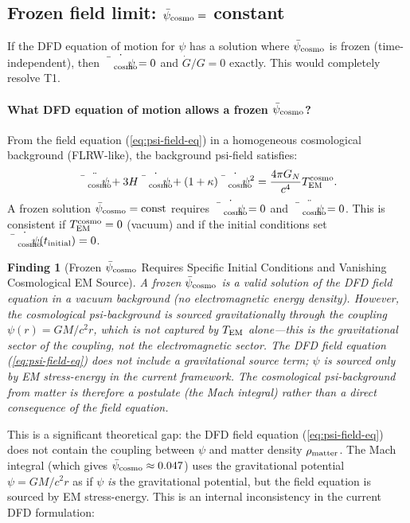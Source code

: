 \documentclass[11pt]{article}
\newtheorem{finding}{Finding}
\newcommand{\psicosmo}{\bar{\psi}_{\rm cosmo}}
\begin{document}
\subsection{Frozen field limit: $\psicosmo = $ constant}

If the DFD equation of motion for $\psi$ has a solution where $\psicosmo$
is frozen (time-independent), then $\dot{\psicosmo} = 0$ and
$\dot{G}/G = 0$ exactly. This would completely resolve T1.

\paragraph{What DFD equation of motion allows a frozen $\psicosmo$?}

From the field equation (\ref{eq:psi-field-eq}) in a homogeneous cosmological
background (FLRW-like), the background psi-field satisfies:
\begin{equation}
\ddot{\psicosmo} + 3H\dot{\psicosmo} + (1+\kappa)\dot{\psicosmo}^2 = \frac{4\pi G_N}{c^4}T_{\rm EM}^{\rm cosmo}.
\label{eq:psi-cosmo-EOM}
\end{equation}
A frozen solution $\psicosmo = \text{const}$ requires $\dot{\psicosmo} = 0$
and $\ddot{\psicosmo} = 0$. This is consistent if $T_{\rm EM}^{\rm cosmo} = 0$
(vacuum) and if the initial conditions set $\dot{\psicosmo}(t_{\rm initial}) = 0$.

\begin{finding}[Frozen $\psicosmo$ Requires Specific Initial Conditions and Vanishing Cosmological EM Source]
\label{find:frozen}
A frozen $\psicosmo$ is a valid solution of the DFD field equation in a vacuum
background (no electromagnetic energy density). However, the cosmological
psi-background is sourced gravitationally through the coupling
$\psi(r) = GM/c^2 r$, which is not captured by $T_{\rm EM}$ alone---this
is the \emph{gravitational} sector of the coupling, not the electromagnetic
sector. The DFD field equation (\ref{eq:psi-field-eq}) does not include a
gravitational source term; $\psi$ is sourced only by EM stress-energy in
the current framework. The cosmological psi-background from matter is
therefore a \emph{postulate} (the Mach integral) rather than a direct
consequence of the field equation.
\end{finding}

This is a significant theoretical gap: the DFD field equation (\ref{eq:psi-field-eq})
does not contain the coupling between $\psi$ and matter density $\rho_{\rm matter}$.
The Mach integral (which gives $\psicosmo \approx 0.047$) uses the gravitational
potential $\psi = GM/c^2 r$ as if $\psi$ \emph{is} the gravitational potential,
but the field equation is sourced by EM stress-energy. This is an internal
inconsistency in the current DFD formulation:
\end{document}
